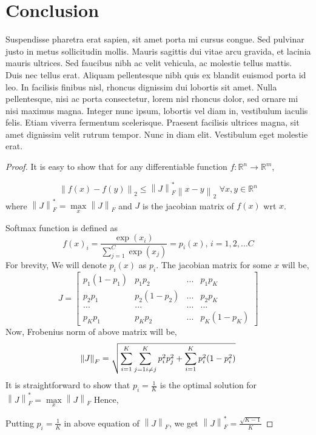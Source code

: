 \documentclass{article}
\begin{document}
\section{Conclusion}
Suspendisse pharetra erat sapien, sit amet porta mi cursus congue. Sed pulvinar justo in metus sollicitudin mollis. Mauris sagittis dui vitae arcu gravida, et lacinia mauris ultrices. Sed faucibus nibh ac velit vehicula, ac molestie tellus mattis. Duis nec tellus erat. Aliquam pellentesque nibh quis ex blandit euismod porta id leo. In facilisis finibus nisl, rhoncus dignissim dui lobortis sit amet. Nulla pellentesque, nisi ac porta consectetur, lorem nisl rhoncus dolor, sed ornare mi nisi maximus magna. Integer nunc ipsum, lobortis vel diam in, vestibulum iaculis felis. Etiam viverra fermentum scelerisque. Praesent facilisis ultrices magna, sit amet dignissim velit rutrum tempor. Nunc in diam elit. Vestibulum eget molestie erat. 

 



\begin{proof}
It is easy to show that for any differentiable function $f:\mathbb{R}^n\rightarrow\mathbb{R}^m$,

\[
\left \|f(x)-f(y)\right \|_2 \leq \left \|J\right \|^*_F \left \|x-y\right\|_2 \, \, \forall x,y\in\mathbb{R}^n
\]
where $\left \|J\right \|^*_F = \max\limits_{x} \left \|J\right \|_F$ and $J$ is the jacobian matrix of $f(x)$ wrt $x$.

Softmax function is defined as
\[
f(x)_i = \frac{\exp(x_i)}{\sum\limits_{j=1}^{C}\exp(x_j)} = p_i(x), \, i={1,2,...C}
\]
For brevity, We will denote $p_i(x)$ as $p_i$. The jacobian matrix for some $x$ will be,
\[
J = \begin{bmatrix} p_1(1-p_1) & p_1p_2  & ... & p_1p_K \\
p_2p_1 & p_2(1-p_2)  & ...  & p_2p_K \\
... & ... & ... & ...  \\
p_{K}p_{1} & p_{K}p_{2}  & ...  & p_{K}(1-p_{K})
\end{bmatrix}
\]
Now, Frobenius norm of above matrix will be,
\[
\left \| J \right \|_F = \sqrt{\sum\limits_{i=1}^{K}\sum\limits_{j=1 \\ i\neq j}^{K}p_{i}^{2}p_{j}^{2} + \sum\limits_{i=1}^{K} p_i^2(1-p_i^2)}
\]
It is straightforward to show that $p_i = \frac{1}{K}$ is the optimal solution for $\left \| J \right \|^{*}_F = \max\limits_{x}\left \| J \right \|_F $ Hence,


Putting $p_i = \frac{1}{K}$ in above equation of $\left \| J \right \|_F$, we get $\left \| J \right \|^{*}_F = \frac{\sqrt{K-1}}{K}$

\end{proof}
\end{document}

